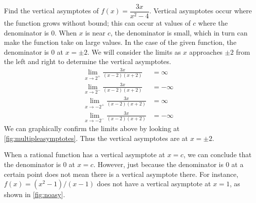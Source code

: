 \begin{example}\label{ex_vertasy1}
Find the vertical asymptotes of $f(x)=\dfrac{3x}{x^2-4}$.
\solution
Vertical asymptotes occur where the function grows without bound; this can occur at values of $c$ where the denominator is 0. When $x$ is near $c$, the denominator is small, which in turn can make the function take on large values.  In the case of the given function, the denominator is 0 at $x=\pm 2$.  We will consider the limits as $x$ approaches $\pm 2$ from the left and right to determine the vertical asymptotes. \vspace{-.3\baselineskip}
%
%
%
\begin{align*}
\lim_{x\to  2^+}\frac{3x}{(x-2)(x+2)}&= \infty\\
\lim_{x\to  2^-}\frac{3x}{(x-2)(x+2)}&=-\infty\\
\lim_{x\to -2^+}\frac{3x}{(x-2)(x+2)}&= \infty\\
\lim_{x\to -2^-}\frac{3x}{(x-2)(x+2)}&=-\infty
\end{align*}
We can graphically confirm the limits above by looking at \autoref{fig:multipleasymptotes}. Thus the vertical asymptotes are at $x=\pm2$.
\end{example}

When a rational function has a vertical asymptote at $x=c$, we can conclude that the denominator is 0 at $x=c$. However, just because the denominator is 0 at a certain point does not mean there is a vertical asymptote there.  For instance, $f(x)=(x^2-1)/(x-1)$ does not have a vertical asymptote at $x=1$, as shown in \autoref{fig:noasy}. 

